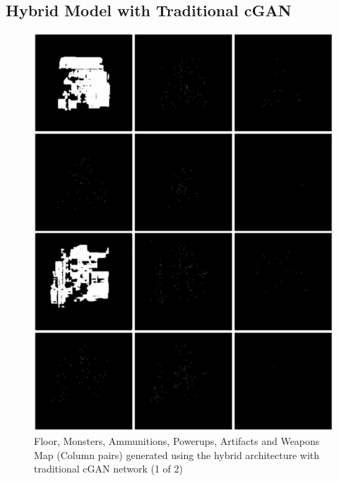 \documentclass{Configuration_Files/PoliMi3i_thesis}
\begin{document}
\subsection{Hybrid Model with Traditional cGAN}
\begin{figure}[H]
    \centering
    \includegraphics[width=1\textwidth]{trad_cgan_sample1.jpg}
    \caption[Samples generated using the traditional cGAN network (1 of 2)]{Floor, Monsters, Ammunitions, Powerups, Artifacts and Weapons Map 
(Column pairs) generated using the hybrid architecture with traditional cGAN network (1 of 2)}
    \label{fig:tradcgansample1}
\end{figure}
\end{document}
